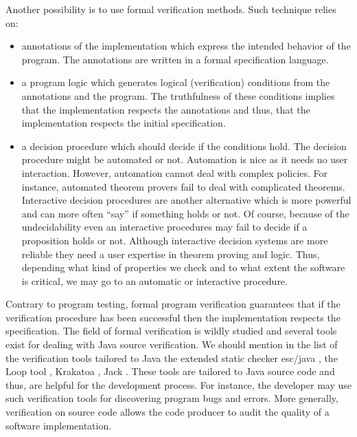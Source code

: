  Another possibility is to use formal verification methods. Such technique relies on:
\begin{itemize} 
   \item annotations of the implementation which express the intended behavior of the program. The annotations
         are written in a formal specification language.
   \item a program logic which  generates logical (verification) conditions  from the annotations and the program. 
         The truthfulness of these conditions implies that the implementation respects the annotations and thus,
	 that the implementation respects the initial specification. 
    
   \item a decision procedure which should decide if the conditions hold. The decision procedure might be automated or not.
         Automation is nice as it needs no user interaction.
         However, automation cannot deal with complex policies. For instance, automated theorem provers 
	 fail to deal with complicated theorems. Interactive decision procedures are another alternative which is 
	 more powerful and can more often ``say'' if something holds or not. Of course, because of the undecidability 
	 even an interactive procedures may fail to decide if a proposition holds or not. Although interactive decision 
	 systems are more reliable they need a user expertise in theorem proving and logic.
         Thus, depending what kind of properties we check and to what extent the software is critical,
	  we may go to an automatic or interactive procedure. 

           
\end{itemize}
Contrary to program testing,  formal program verification guarantees that if the verification procedure 
has been successful then the implementation respects the specification. 
 The field of formal  verification is wildly studied and several  tools exist for
dealing with Java source verification. We should mention in the list of the verification tools tailored to Java the extended static checker
esc/java \cite{escjava}, the Loop tool \cite{jacobs03java},
Krakatoa \cite{marche03krakatoa}, Jack \cite{BRL-JACK}. These tools are tailored to Java source code and thus,
 are helpful for the development process. For instance, the developer may use such verification tools for discovering program bugs and
 errors. More generally, verification on source code allows the code producer to audit the quality of a software implementation.
 
